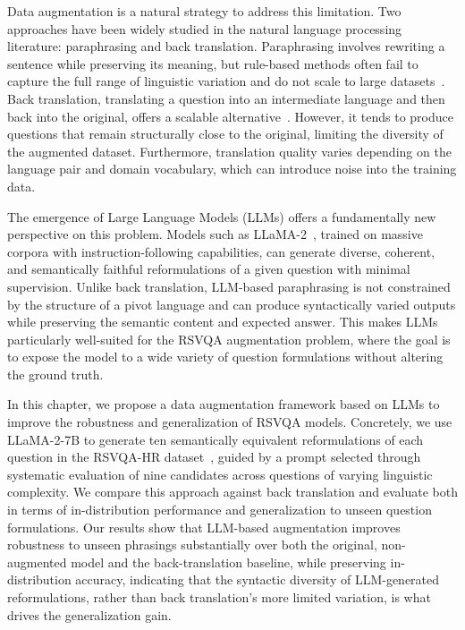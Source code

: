 Data augmentation is a natural strategy to address this
limitation. Two approaches have been widely studied in the
natural language processing literature: paraphrasing and back
translation. Paraphrasing involves rewriting a sentence while
preserving its meaning, but rule-based methods often fail to
capture the full range of linguistic variation and do not scale
to large datasets~\cite{bhagat2013paraphrase}. Back
translation, translating a question into an intermediate
language and then back into the original, offers a scalable
alternative~\cite{yuan2023multilingual}. However, it tends to
produce questions that remain structurally close to the
original, limiting the diversity of the augmented dataset.
Furthermore, translation quality varies depending on the
language pair and domain vocabulary, which can introduce
noise into the training data.
 
The emergence of Large Language Models (LLMs) offers a
fundamentally new perspective on this problem. Models such
as LLaMA-2~\cite{touvron2023llama2openfoundation}, trained on massive
corpora with instruction-following capabilities, can generate
diverse, coherent, and semantically faithful reformulations of
a given question with minimal supervision. Unlike back
translation, LLM-based paraphrasing is not constrained by the
structure of a pivot language and can produce syntactically
varied outputs while preserving the semantic content and
expected answer. This makes LLMs particularly well-suited
for the RSVQA augmentation problem, where the goal is to
expose the model to a wide variety of question formulations
without altering the ground truth.
 
In this chapter, we propose a data augmentation framework
based on LLMs to improve the robustness and generalization
of RSVQA models. Concretely, we use LLaMA-2-7B to
generate ten semantically equivalent reformulations of each
question in the RSVQA-HR dataset~\cite{lobry2020rsvqa},
guided by a prompt selected through systematic evaluation of
nine candidates across questions of varying linguistic
complexity. We compare this approach against back translation
and evaluate both in terms of in-distribution performance and
generalization to unseen question formulations. Our results
show that LLM-based augmentation improves robustness to
unseen phrasings substantially over both the original,
non-augmented model and the back-translation baseline, while
preserving in-distribution accuracy, indicating that the
syntactic diversity of LLM-generated reformulations, rather
than back translation's more limited variation, is what
drives the generalization gain.
 
